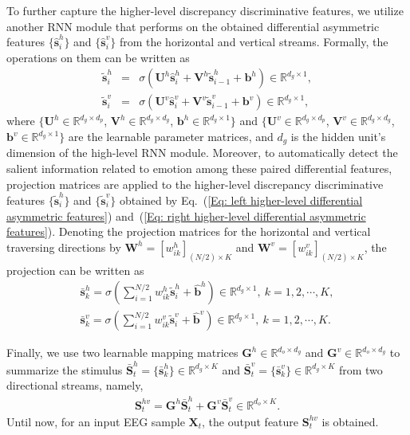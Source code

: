 \documentclass[journal]{IEEEtran}
\begin{document}
To further capture the higher-level discrepancy discriminative features, we utilize another RNN module that performs on the obtained differential asymmetric features $\{\hat{\mathbf{s}}^h_i\}$ and $\{\hat{\mathbf{s}}^v_i\}$ from the horizontal and vertical streams. Formally, the operations on them can be written as
\begin{eqnarray}
\label{Eq: left higher-level differential asymmetric features}
\tilde{\mathbf{s}}^h_i \!\!\!\!&=&\!\!\!\! \sigma(\mathbf{U}^h \hat{\mathbf{s}}^h_i + \mathbf{V}^h \tilde{\mathbf{s}}^h_{i-1} + \mathbf{b}^h) \in \mathbb{R}^{d_g \times 1}, \\
\tilde{\mathbf{s}}^v_i \!\!\!\!&=&\!\!\!\! \sigma(\mathbf{U}^v \hat{\mathbf{s}}^v_i + \mathbf{V}^v \tilde{\mathbf{s}}^v_{i-1} + \mathbf{b}^v) \in \mathbb{R}^{d_g \times 1},
\label{Eq: right higher-level differential asymmetric features}
\end{eqnarray} 
where $\{\mathbf{U}^h \!\in\! \mathbb{R}^{d_g \times d_p}$, $\mathbf{V}^h \!\in\! \mathbb{R}^{d_g \times d_g}$, $\mathbf{b}^h \!\in\! \mathbb{R}^{d_g \times 1}\}$ and $\{\mathbf{U}^v \!\in\! \mathbb{R}^{d_g \times d_p}$, $\mathbf{V}^v \!\in\! \mathbb{R}^{d_g \times d_g}$, $\mathbf{b}^v \!\in\! \mathbb{R}^{d_g \times 1}\}$ are the learnable parameter matrices, and $d_g$ is the hidden unit's dimension of the high-level RNN module. Moreover, to automatically detect the salient information related to emotion among these paired differential features, projection matrices are applied to the higher-level discrepancy discriminative features $\{\tilde{\mathbf{s}}^h_i\}$ and $\{\tilde{\mathbf{s}}^v_i\}$ obtained by Eq.~(\ref{Eq: left higher-level differential asymmetric features}) and~(\ref{Eq: right higher-level differential asymmetric features}). Denoting the projection matrices for the horizontal and vertical traversing directions by $\mathbf{W}^h \!=\! [w^h_{ik}]_{(N/2) \times K}$ and $\mathbf{W}^v \!=\! [w^v_{ik}]_{(N/2) \times K}$, the projection can be written as	
\begin{eqnarray}
\bar{\mathbf{s}}^h_k\!=\! \sigma(\sum\nolimits_{i=1}^{N/2} w^h_{ik} \tilde{\mathbf{s}}^h_i+\hat{\mathbf{b}}^h)\in\mathbb{R}^{d_g \times 1}, ~k\!=\!1,2,\cdots,K, \!\\
\bar{\mathbf{s}}^v_k\!=\! \sigma(\sum\nolimits_{i=1}^{N/2} w^v_{ik} \tilde{\mathbf{s}}^v_i+\hat{\mathbf{b}}^v)\in\mathbb{R}^{d_g \times 1}, ~k\!=\!1,2,\cdots,K.
\end{eqnarray} 

Finally, we use two learnable mapping matrices $\mathbf{G}^h \!\in\! \mathbb{R}^{d_o \times d_g}$ and $\mathbf{G}^v \!\in\! \mathbb{R}^{d_o \times d_g}$ to summarize the stimulus $\bar{\mathbf{S}}_t^h \!=\! \{\bar{\mathbf{s}}^h_k\} \!\in\! \mathbb{R}^{d_g \times K}$ and $\bar{\mathbf{S}}_t^v \!=\! \{\bar{\mathbf{s}}^v_k\} \!\in\! \mathbb{R}^{d_g \times K}$ from two directional streams, namely,
\begin{eqnarray}
\mathbf{S}_t^{hv}= \mathbf{G}^h \bar{\mathbf{S}}_t^h  + \mathbf{G}^v \bar{\mathbf{S}}_t^v \in \mathbb{R}^{d_o \times K}.
\end{eqnarray} 
Until now, for an input EEG sample $\mathbf{X}_t$, the output feature $\mathbf{S}_t^{hv}$ is obtained.	
\end{document}

